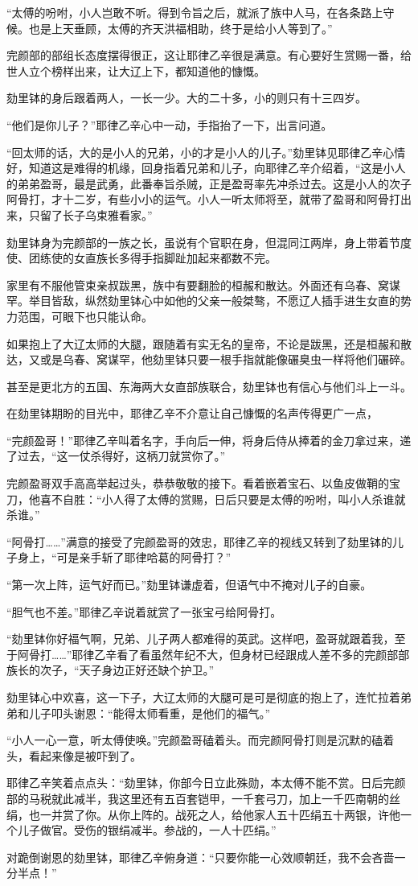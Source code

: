 “太傅的吩咐，小人岂敢不听。得到令旨之后，就派了族中人马，在各条路上守候。也是上天垂顾，太傅的齐天洪福相助，终于是给小人等到了。”

完颜部的部组长态度摆得很正，这让耶律乙辛很是满意。有心要好生赏赐一番，给世人立个榜样出来，让大辽上下，都知道他的慷慨。

劾里钵的身后跟着两人，一长一少。大的二十多，小的则只有十三四岁。

“他们是你儿子？”耶律乙辛心中一动，手指抬了一下，出言问道。

“回太师的话，大的是小人的兄弟，小的才是小人的儿子。”劾里钵见耶律乙辛心情好，知道这是难得的机缘，回身指着兄弟和儿子，向耶律乙辛介绍着，“这是小人的弟弟盈哥，最是武勇，此番奉旨杀贼，正是盈哥率先冲杀过去。这是小人的次子阿骨打，才十二岁，有些小小的运气。小人一听太师将至，就带了盈哥和阿骨打出来，只留了长子乌束雅看家。”

劾里钵身为完颜部的一族之长，虽说有个官职在身，但混同江两岸，身上带着节度使、团练使的女直族长多得手指脚趾加起来都数不完。

家里有不服他管束亲叔跋黑，族中有要翻脸的桓赧和散达。外面还有乌春、窝谋罕。举目皆敌，纵然劾里钵心中如他的父亲一般桀骜，不愿辽人插手进生女直的势力范围，可眼下也只能认命。

如果抱上了大辽太师的大腿，跟随着有实无名的皇帝，不论是跋黑，还是桓赧和散达，又或是乌春、窝谋罕，他劾里钵只要一根手指就能像碾臭虫一样将他们碾碎。

甚至是更北方的五国、东海两大女直部族联合，劾里钵也有信心与他们斗上一斗。

在劾里钵期盼的目光中，耶律乙辛不介意让自己慷慨的名声传得更广一点，

“完颜盈哥！”耶律乙辛叫着名字，手向后一伸，将身后侍从捧着的金刀拿过来，递了过去，“这一仗杀得好，这柄刀就赏你了。”

完颜盈哥双手高高举起过头，恭恭敬敬的接下。看着嵌着宝石、以鱼皮做鞘的宝刀，他喜不自胜：“小人得了太傅的赏赐，日后只要是太傅的吩咐，叫小人杀谁就杀谁。”

“阿骨打……”满意的接受了完颜盈哥的效忠，耶律乙辛的视线又转到了劾里钵的儿子身上，“可是亲手斩了耶律哈葛的阿骨打？”

“第一次上阵，运气好而已。”劾里钵谦虚着，但语气中不掩对儿子的自豪。

“胆气也不差。”耶律乙辛说着就赏了一张宝弓给阿骨打。

“劾里钵你好福气啊，兄弟、儿子两人都难得的英武。这样吧，盈哥就跟着我，至于阿骨打……”耶律乙辛看了看虽然年纪不大，但身材已经跟成人差不多的完颜部部族长的次子，“天子身边正好还缺个护卫。”

劾里钵心中欢喜，这一下子，大辽太师的大腿可是可是彻底的抱上了，连忙拉着弟弟和儿子叩头谢恩：“能得太师看重，是他们的福气。”

“小人一心一意，听太傅使唤。”完颜盈哥磕着头。而完颜阿骨打则是沉默的磕着头，看起来像是被吓到了。

耶律乙辛笑着点点头：“劾里钵，你部今日立此殊勋，本太傅不能不赏。日后完颜部的马税就此减半，我这里还有五百套铠甲，一千套弓刀，加上一千匹南朝的丝绢，也一并赏了你。从你上阵的。战死之人，给他家人五十匹绢五十两银，许他一个儿子做官。受伤的银绢减半。参战的，一人十匹绢。”

对跪倒谢恩的劾里钵，耶律乙辛俯身道：“只要你能一心效顺朝廷，我不会吝啬一分半点！”

